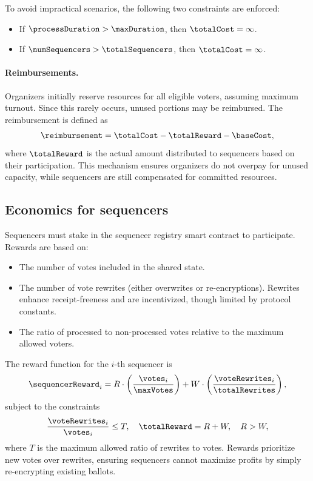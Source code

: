 \noi To avoid impractical scenarios, the following two constraints are enforced:
\begin{itemize}
	\item If $\processDuration > \maxDuration$, then $\totalCost = \infty$.
	\item If $\numSequencers > \totalSequencers$, then $\totalCost = \infty$.
\end{itemize}

\paragraph{Reimbursements.} Organizers initially reserve resources for all eligible voters, assuming maximum turnout. Since this rarely occurs, unused portions may be reimbursed. The reimbursement is defined as
\[
\reimbursement = \totalCost - \totalReward - \baseCost,
\]
where $\totalReward$ is the actual amount distributed to sequencers based on their participation. This mechanism ensures organizers do not overpay for unused capacity, while sequencers are still compensated for committed resources.

\subsection{Economics for sequencers}

Sequencers must stake \token in the sequencer registry smart contract to participate. Rewards are based on:

\begin{itemize}
	\item The number of votes included in the shared state.
	\item The number of vote rewrites (either overwrites or re-encryptions). Rewrites enhance receipt-freeness and are incentivized, though limited by protocol constants.
	\item The ratio of processed to non-processed votes relative to the maximum allowed voters.
\end{itemize}
%
The reward function for the $i$-th sequencer is
\[
\sequencerReward_i = R \cdot \left( \frac{\votes_i}{\maxVotes} \right) + W \cdot \left( \frac{\voteRewrites_i}{\totalRewrites} \right),
\]
subject to the constraints
\[
\frac{\voteRewrites_i}{\votes_i} \leq T, \quad \totalReward = R + W, \quad R > W, 
\]
where $T$ is the maximum allowed ratio of rewrites to votes. Rewards prioritize new votes over rewrites, ensuring sequencers cannot maximize profits by simply re-encrypting existing ballots.

